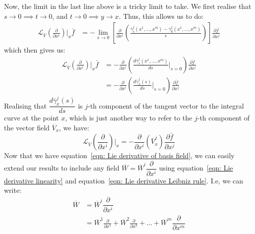         Now, the limit in the last line above is a tricky limit to take. We
        first realise that $s \to 0 \implies t \to 0$, and $t \to 0 \implies
        y \to x$. Thus, this allows us to do:
        \begin{align*}
          \mathcal{L}_{\overline{V}}\left(\frac{\partial}{\partial
          x^i}\right)\Bigr|_x \bar{f}
          &= -\lim_{s \to 0}\left[\frac{\partial}{\partial
          x^i}\left(\frac{\overline{\gamma}_{s}^j(x^1,...,x^m) -
          \overline{\gamma}_{0}^j(x^1,...,x^m)}{s}\right)
          \right]\frac{\partial \bar{f}}{\partial x^j}
        \end{align*}
        which then gives us:
        \begin{align*}
          \mathcal{L}_{\overline{V}}\left(\frac{\partial}{\partial
          x^i}\right)\Bigr|_x \bar{f} 
          &= -\frac{\partial}{\partial x^i}\left(\frac{d
          \overline{\gamma}_s^j(x^1,...,x^m)}{ds}\Bigr|_{s=0}\right)
          \frac{\partial \bar{f}}{\partial x^j} \\
          &= -\frac{\partial}{\partial x^i}\left(\frac{d
          \overline{\gamma}_x^j(s)}{ds}\Bigr|_{s=0}\right)
          \frac{\partial \bar{f}}{\partial x^j}
        \end{align*}
        Realising that $\dfrac{d \overline{\gamma}_x^j(s)}{ds}$ is $j$-th
        component of the tangent vector to the integral curve at the point
        $x$, which is just another way to refer to the $j$-th component of
        the vector field $\overline{V}_x$, we have:
        \begin{equation}
          \label{eqn: Lie derivative of basis field}
          \mathcal{L}_{\overline{V}}\left(\frac{\partial}{\partial
          x^i}\right)\Bigr|_x = -\frac{\partial}{\partial
          x^i}\left(\overline{V}^j_x\right) \frac{\partial \bar{f}}{\partial
          x^j}
        \end{equation}
        Now that we have equation~\ref{eqn: Lie derivative of basis field},
        we can easily extend our results to include any field $\overline{W} =
        \overline{W}^i\dfrac{\partial}{\partial x^i}$ using
        equation~\ref{eqn: Lie derivative linearity} and equation~\ref{eqn:
        Lie derivative Leibniz rule}. I.e, we can write:
        \begin{align*}
          \overline{W} &= \overline{W}^i\dfrac{\partial}{\partial x^i} \\ 
          &= \overline{W}^1\frac{\partial}{\partial x^1} +
          \overline{W}^2\frac{\partial}{\partial x^2} + ... +
          \overline{W}^m\dfrac{\partial}{\partial x^m}
        \end{align*}
